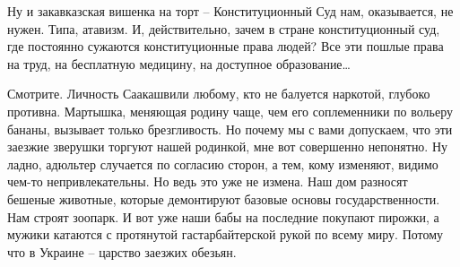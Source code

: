 Ну и закавказская вишенка на торт – Конституционный Суд нам, оказывается, не
нужен. Типа, атавизм. И, действительно, зачем в стране конституционный суд, где
постоянно сужаются конституционные права людей? Все эти пошлые права на труд,
на бесплатную медицину, на доступное образование…

Смотрите. Личность Саакашвили любому, кто не балуется наркотой, глубоко
противна. Мартышка, меняющая родину чаще, чем его соплеменники по вольеру
бананы, вызывает только брезгливость. Но почему мы с вами допускаем, что эти
заезжие зверушки торгуют нашей родинкой, мне вот совершенно непонятно. Ну
ладно, адюльтер случается по согласию сторон, а тем, кому изменяют, видимо
чем-то непривлекательны. Но ведь это уже не измена. Наш дом разносят бешеные
животные, которые демонтируют базовые основы государственности. Нам строят
зоопарк. И вот уже наши бабы на последние покупают пирожки, а мужики катаются с
протянутой гастарбайтерской рукой по всему миру. Потому что в Украине – царство
заезжих обезьян.
